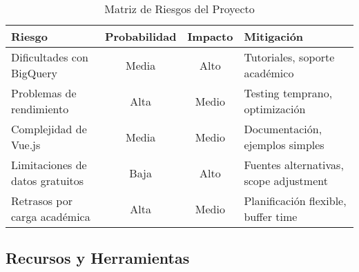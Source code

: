 
\begin{table}[H]
    \centering
    \small
    \begin{tabular}{|l|c|c|l|}
        \hline
        \textbf{Riesgo} & \textbf{Probabilidad} & \textbf{Impacto} & \textbf{Mitigación} \\
        \hline
        Dificultades con BigQuery & Media & Alto & Tutoriales, soporte académico \\
        \hline
        Problemas de rendimiento & Alta & Medio & Testing temprano, optimización \\
        \hline
        Complejidad de Vue.js & Media & Medio & Documentación, ejemplos simples \\
        \hline
        Limitaciones de datos gratuitos & Baja & Alto & Fuentes alternativas, scope adjustment \\
        \hline
        Retrasos por carga académica & Alta & Medio & Planificación flexible, buffer time \\
        \hline
    \end{tabular}
    \caption{Matriz de Riesgos del Proyecto}
    \label{tab:riesgos}
\end{table}

\subsection{Recursos y Herramientas}


